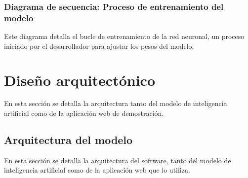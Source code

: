 %	


\subsubsection{Diagrama de secuencia: Proceso de entrenamiento del modelo}
Este diagrama detalla el bucle de entrenamiento de la red neuronal, un proceso iniciado por el desarrollador para ajustar los pesos del modelo.

%	


\section{Diseño arquitectónico}
En esta sección se detalla la arquitectura tanto del modelo de inteligencia artificial como de la aplicación web de demostración.

\subsection{Arquitectura del modelo}
En esta sección se detalla la arquitectura del software, tanto del modelo de inteligencia artificial como de la aplicación web que lo utiliza.

